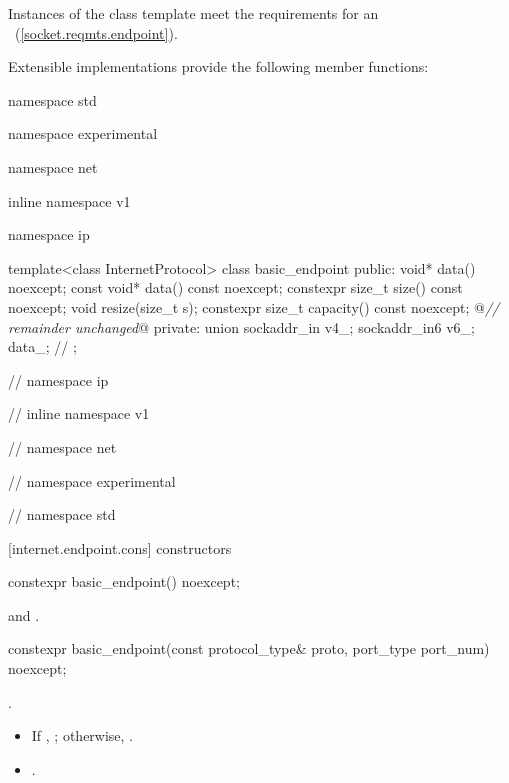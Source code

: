 \pnum
Instances of the  class template meet the requirements for an ~(\ref{socket.reqmts.endpoint}).

%
\pnum
 Extensible implementations provide the following member functions:

\begin{codeblock}
namespace std {
namespace experimental {
namespace net {
inline namespace v1 {
namespace ip {

  template<class InternetProtocol>
  class basic_endpoint
  {
  public:
    void* data() noexcept;
    const void* data() const noexcept;
    constexpr size_t size() const noexcept;
    void resize(size_t s);
    constexpr size_t capacity() const noexcept;
    @\textit{// remainder unchanged}@
  private:
    union
    {
      sockaddr_in v4_;
      sockaddr_in6 v6_;
    } data_; // \expos
  };

} // namespace ip
} // inline namespace v1
} // namespace net
} // namespace experimental
} // namespace std
\end{codeblock}


[internet.endpoint.cons]{ constructors}

\begin{itemdecl}
constexpr basic_endpoint() noexcept;
\end{itemdecl}

\begin{itemdescr}
\pnum
\postconditions {} and .
\end{itemdescr}

\begin{itemdecl}
constexpr basic_endpoint(const protocol_type& proto,
                         port_type port_num) noexcept;
\end{itemdecl}

\begin{itemdescr}
\pnum
\requires {}.

\pnum
\postconditions 
\begin{itemize}
\item
 If , ; otherwise, .
\item
{}.
\end{itemize}
\end{itemdescr}

